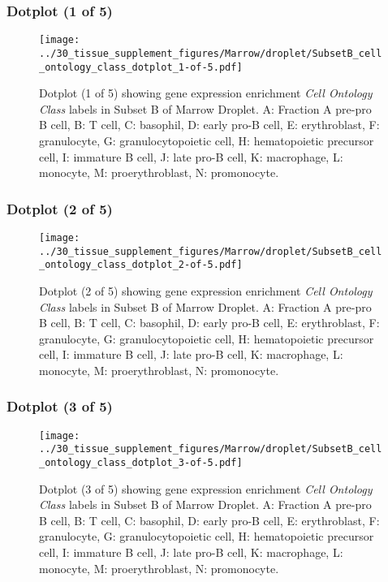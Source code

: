 \clearpage

\subsubsection{Dotplot (1 of 5)}
\begin{figure}[h]
\centering
\texttt{[image: ../30\_tissue\_supplement\_figures/Marrow/droplet/SubsetB\_cell\_ontology\_class\_dotplot\_1-of-5.pdf]}

\caption{ Dotplot (1 of 5)  showing gene expression enrichment \emph{Cell Ontology Class} labels in Subset B of Marrow Droplet. A: Fraction A pre-pro B cell, B: T cell, C: basophil, D: early pro-B cell, E: erythroblast, F: granulocyte, G: granulocytopoietic cell, H: hematopoietic precursor cell, I: immature B cell, J: late pro-B cell, K: macrophage, L: monocyte, M: proerythroblast, N: promonocyte.}
\end{figure}


\clearpage

\subsubsection{Dotplot (2 of 5)}
\begin{figure}[h]
\centering
\texttt{[image: ../30\_tissue\_supplement\_figures/Marrow/droplet/SubsetB\_cell\_ontology\_class\_dotplot\_2-of-5.pdf]}

\caption{ Dotplot (2 of 5)  showing gene expression enrichment \emph{Cell Ontology Class} labels in Subset B of Marrow Droplet. A: Fraction A pre-pro B cell, B: T cell, C: basophil, D: early pro-B cell, E: erythroblast, F: granulocyte, G: granulocytopoietic cell, H: hematopoietic precursor cell, I: immature B cell, J: late pro-B cell, K: macrophage, L: monocyte, M: proerythroblast, N: promonocyte.}
\end{figure}


\clearpage

\subsubsection{Dotplot (3 of 5)}
\begin{figure}[h]
\centering
\texttt{[image: ../30\_tissue\_supplement\_figures/Marrow/droplet/SubsetB\_cell\_ontology\_class\_dotplot\_3-of-5.pdf]}

\caption{ Dotplot (3 of 5)  showing gene expression enrichment \emph{Cell Ontology Class} labels in Subset B of Marrow Droplet. A: Fraction A pre-pro B cell, B: T cell, C: basophil, D: early pro-B cell, E: erythroblast, F: granulocyte, G: granulocytopoietic cell, H: hematopoietic precursor cell, I: immature B cell, J: late pro-B cell, K: macrophage, L: monocyte, M: proerythroblast, N: promonocyte.}
\end{figure}


